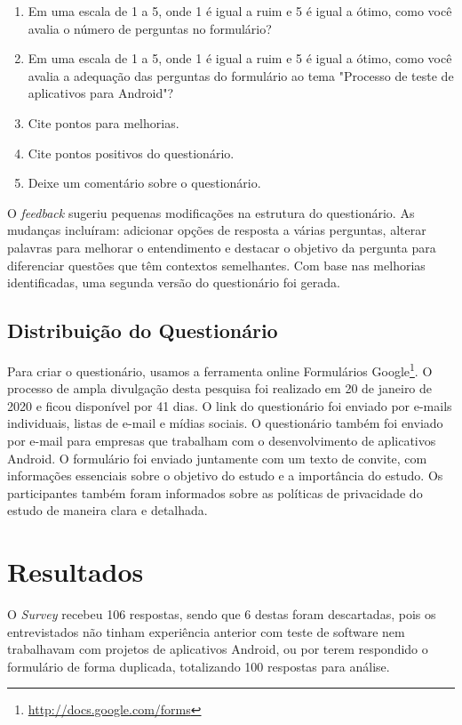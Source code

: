 \begin{enumerate}
    \item Em uma escala de 1 a 5, onde 1 é igual a ruim e 5 é igual a ótimo, como você avalia o número de perguntas no formulário?
    \item Em uma escala de 1 a 5, onde 1 é igual a ruim e 5 é igual a ótimo, como você avalia a adequação das perguntas do formulário ao tema "Processo de teste de aplicativos para Android"?
    \item Cite pontos para melhorias.
    \item Cite pontos positivos do questionário.
    \item Deixe um comentário sobre o questionário.
\end{enumerate}

O \textit{feedback} sugeriu pequenas modificações na estrutura do questionário. As mudanças incluíram: adicionar opções de resposta a várias perguntas, alterar palavras para melhorar o entendimento e destacar o objetivo da pergunta para diferenciar questões que têm contextos semelhantes. Com base nas melhorias identificadas, uma segunda versão do questionário foi gerada.


\subsection{Distribuição do Questionário}

Para criar o questionário, usamos a ferramenta online Formulários Google\footnote{\url{http://docs.google.com/forms}}. O processo de ampla divulgação desta pesquisa foi realizado em 20 de janeiro de 2020 e ficou disponível por 41 dias. O link do questionário foi enviado por e-mails individuais, listas de e-mail e mídias sociais. O questionário também foi enviado por e-mail para empresas que trabalham com o desenvolvimento de aplicativos Android. O formulário foi enviado juntamente com um texto de convite, com informações essenciais sobre o objetivo do estudo e a importância do estudo. Os participantes também foram informados sobre as políticas de privacidade do estudo de maneira clara e detalhada.


\section{Resultados}\label{resultssurvey}

O \textit{Survey} recebeu 106 respostas, sendo que 6 destas foram descartadas, pois os entrevistados não tinham experiência anterior com teste de software nem trabalhavam com projetos de aplicativos Android, ou por terem respondido o formulário de forma duplicada, totalizando 100 respostas para análise. 

